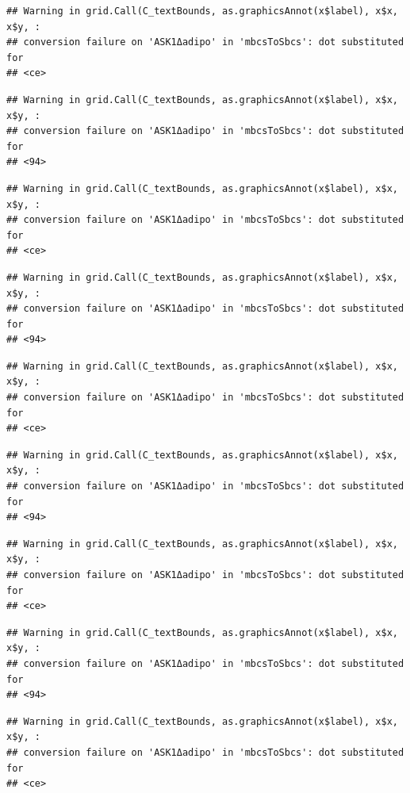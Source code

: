 \documentclass[]{book}
\begin{document}
\begin{verbatim}
## Warning in grid.Call(C_textBounds, as.graphicsAnnot(x$label), x$x, x$y, :
## conversion failure on 'ASK1Δadipo' in 'mbcsToSbcs': dot substituted for
## <ce>
\end{verbatim}

\begin{verbatim}
## Warning in grid.Call(C_textBounds, as.graphicsAnnot(x$label), x$x, x$y, :
## conversion failure on 'ASK1Δadipo' in 'mbcsToSbcs': dot substituted for
## <94>
\end{verbatim}

\begin{verbatim}
## Warning in grid.Call(C_textBounds, as.graphicsAnnot(x$label), x$x, x$y, :
## conversion failure on 'ASK1Δadipo' in 'mbcsToSbcs': dot substituted for
## <ce>
\end{verbatim}

\begin{verbatim}
## Warning in grid.Call(C_textBounds, as.graphicsAnnot(x$label), x$x, x$y, :
## conversion failure on 'ASK1Δadipo' in 'mbcsToSbcs': dot substituted for
## <94>
\end{verbatim}

\begin{verbatim}
## Warning in grid.Call(C_textBounds, as.graphicsAnnot(x$label), x$x, x$y, :
## conversion failure on 'ASK1Δadipo' in 'mbcsToSbcs': dot substituted for
## <ce>
\end{verbatim}

\begin{verbatim}
## Warning in grid.Call(C_textBounds, as.graphicsAnnot(x$label), x$x, x$y, :
## conversion failure on 'ASK1Δadipo' in 'mbcsToSbcs': dot substituted for
## <94>
\end{verbatim}

\begin{verbatim}
## Warning in grid.Call(C_textBounds, as.graphicsAnnot(x$label), x$x, x$y, :
## conversion failure on 'ASK1Δadipo' in 'mbcsToSbcs': dot substituted for
## <ce>
\end{verbatim}

\begin{verbatim}
## Warning in grid.Call(C_textBounds, as.graphicsAnnot(x$label), x$x, x$y, :
## conversion failure on 'ASK1Δadipo' in 'mbcsToSbcs': dot substituted for
## <94>
\end{verbatim}

\begin{verbatim}
## Warning in grid.Call(C_textBounds, as.graphicsAnnot(x$label), x$x, x$y, :
## conversion failure on 'ASK1Δadipo' in 'mbcsToSbcs': dot substituted for
## <ce>
\end{verbatim}
\end{document}
